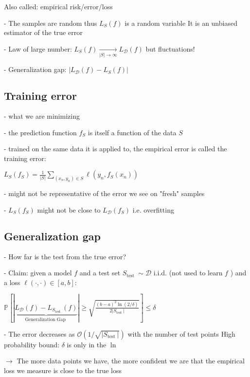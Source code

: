 Also called: empirical risk/error/loss

- The samples are random thus $L_{S}(f)$ is a random variable It is an unbiased estimator of the true error

- Law of large number: $L_{S}(f) \underset{|S| \rightarrow \infty}{\rightarrow} L_{\mathscr{D}}(f)$ but fluctuations!

- Generalization gap: $\left|L_{\mathscr{D}}(f)-L_{S}(f)\right|$

\subsection*{Training error}

- what we are minimizing

- the prediction function $f_{S}$ is itself a function of the data $S$

- trained on the same data it is applied to, the empirical error is called the training error:

$
L_{S}\left(f_{S}\right)=\frac{1}{|S|} \sum_{\left(x_{n}, y_{n}\right) \in S} \ell\left(y_{n}, f_{S}\left(x_{n}\right)\right)
$

- might not be representative of the error we see on "fresh" samples

- $L_{S}\left(f_{S}\right)$ might not be close to $L_{\mathscr{D}}\left(f_{S}\right)$ i.e. overfitting

\subsection*{Generalization gap}

- How far is the test from the true error?

- Claim: given a model $f$ and a test set $S_{\text {test }} \sim \mathscr{D}$ i.i.d. (not used to learn $f$ ) and a loss $\ell(\cdot, \cdot) \in[a, b]$:

$
\mathbb{P}\left[|\underbrace{L_{\mathscr{D}}(f)-L_{S_{\text {test }}}(f)}_{\text {Generalization Gap }}| \geq \sqrt{\frac{(b-a)^{2} \ln (2 / \delta)}{2\left|S_{\text {test }}\right|}}\right] \leq \delta
$

- The error decreases as $\mathcal{O}\left(1 / \sqrt{\left|S_{\text {test }}\right|}\right)$ with the number of test points High probability bound: $\delta$ is only in the $\ln$

$\rightarrow$ The more data points we have, the more confident we are that the empirical loss we measure is close to the true loss

